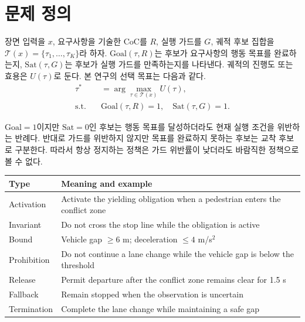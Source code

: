 \section{문제 정의}
\label{sec:problem}


장면 입력을 $x$, 요구사항을 기술한 CoC를 $R$, 실행 가드를 $G$, 궤적 후보 집합을 $\mathcal{T}(x)=\{\tau_1,\ldots,\tau_K\}$라 하자. $\mathrm{Goal}(\tau,R)$는 후보가 요구사항의 행동 목표를 완료하는지, $\mathrm{Sat}(\tau,G)$는 후보가 실행 가드를 만족하는지를 나타낸다. 궤적의 진행도 또는 효용은 $U(\tau)$로 둔다. 본 연구의 선택 목표는 다음과 같다.
\begin{equation}
\begin{aligned}
\tau^*&=\arg\max_{\tau\in\mathcal{T}(x)} U(\tau),\\
\mathrm{s.t.}\quad &\mathrm{Goal}(\tau,R)=1,\quad \mathrm{Sat}(\tau,G)=1.
\end{aligned}
\label{eq:selection}
\end{equation}

$\mathrm{Goal}=1$이지만 $\mathrm{Sat}=0$인 후보는 행동 목표를 달성하더라도 현재 실행 조건을 위반하는 반례다. 반대로 가드를 위반하지 않지만 목표를 완료하지 못하는 후보는 교착 후보로 구분한다. 따라서 항상 정지하는 정책은 가드 위반률이 낮더라도 바람직한 정책으로 볼 수 없다.

\begin{table}[t]
\centering
{}
\label{tab:taxonomy}
\footnotesize
\begin{tabularx}{\columnwidth}{L{0.30\columnwidth}Y}
\toprule
Type & Meaning and example \\
\midrule
Activation & Activate the yielding obligation when a pedestrian enters the conflict zone \\
Invariant & Do not cross the stop line while the obligation is active \\
Bound & Vehicle gap $\geq6$ m; deceleration $\leq4$ m/s$^2$ \\
Prohibition & Do not continue a lane change while the vehicle gap is below the threshold \\
Release & Permit departure after the conflict zone remains clear for 1.5 s \\
Fallback & Remain stopped when the observation is uncertain \\
Termination & Complete the lane change while maintaining a safe gap \\
\bottomrule
\end{tabularx}
\end{table}

